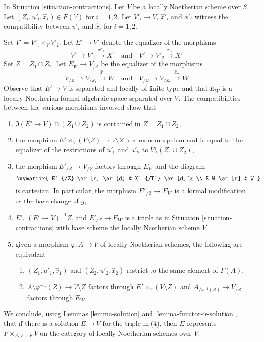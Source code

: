 \begin{remark}
\label{remark-diagonal}
In Situation \ref{situation-contractions}.
Let $V$ be a locally Noetherian scheme over $S$.
Let $(Z_i, u'_i, \hat x_i) \in F(V)$ for $i = 1, 2$. Let $V'_i \to V$,
$\hat x'_i$ and $x'_i$ witness the compatibility between $u'_i$ and
$\hat x_i$ for $i = 1, 2$.

\medskip\noindent
Set $V' = V'_1 \times_V V'_2$. Let $E' \to V'$ denote the equalizer
of the morphisms
$$
V' \to V'_1 \xrightarrow{x'_1} X'
\quad\text{and}\quad
V' \to V'_2 \xrightarrow{x'_2} X'
$$
Set $Z = Z_1 \cap Z_2$. Let $E_W \to V_{/Z}$
be the equalizer of the morphisms
$$
V_{/Z} \to V_{/Z_1} \xrightarrow{\hat x_1} W
\quad\text{and}\quad
V_{/Z} \to V_{/Z_2} \xrightarrow{\hat x_2} W
$$
Observe that $E' \to V$ is separated and locally of finite type
and that $E_W$ is a locally Noetherian formal algebraic space
separated over $V$.
The compatibilities between the various morphisms involved show that
\begin{enumerate}
\item $\Im(E' \to V) \cap (Z_1 \cup Z_2)$
is contained in $Z = Z_1 \cap Z_2$, 
\item the morphism $E' \times_V (V \setminus Z) \to V \setminus Z$
is a monomorphism and is equal to the equalizer of the restrictions
of $u'_1$ and $u'_2$ to $V \setminus (Z_1 \cup Z_2)$,
\item the morphism $E'_{/Z} \to V_{/Z}$ factors through $E_W$
and the diagram
$$
\xymatrix{
E'_{/Z} \ar[r] \ar[d] & X'_{/T'} \ar[d]^g \\
E_W \ar[r] & W
}
$$
is cartesian. In particular, the morphism $E'_{/Z} \to E_W$
is a formal modification as the base change of $g$,
\item $E'$, $(E' \to V)^{-1}Z$, and $E'_{/Z} \to E_W$
is a triple as in Situation \ref{situation-contractions}
with base scheme the locally Noetherian scheme $V$,
\item given a morphism $\varphi : A \to V$
of locally Noetherian schemes, the following are equivalent
\begin{enumerate}
\item $(Z_1, u'_1, \hat x_1)$ and $(Z_2, u'_2, \hat x_2)$
restrict to the same element of $F(A)$,
\item $A \setminus \varphi^{-1}(Z) \to V \setminus Z$
factors through $E' \times_V (V \setminus Z)$
and $A_{/\varphi^{-1}(Z)} \to V_{/Z}$
factors through $E_W$.
\end{enumerate}
\end{enumerate}
We conclude, using
Lemmas \ref{lemma-solution} and \ref{lemma-functor-is-solution},
that if there is a solution $E \to V$
for the triple in (4), then $E$ represents
$F \times_{\Delta, F \times F} V$ on the category of
locally Noetherian schemes over $V$.
\end{remark}

